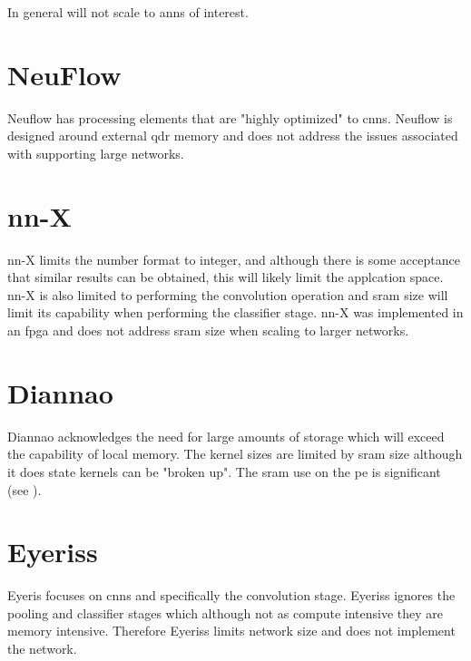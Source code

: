 {{{{In general will not scale to \acp{ann} of interest.


\section{NeuFlow \cite{farabet2011neuflow}}
Neuflow\cite{farabet2011neuflow} has processing elements that are "highly optimized" to \acp{cnn}.
Neuflow is designed around external \ac{qdr} memory and does not address the issues associated with supporting large networks.


\section[nn-X]{nn-X \cite{gokhale2014240}}
nn-X\cite{gokhale2014240} limits the number format to integer, and although there is some acceptance that similar
results can be obtained, this will likely limit the applcation space. nn-X is also limited to performing the convolution operation
and \ac{sram} size will limit its capability when performing the classifier stage.
nn-X was implemented in an fpga and does not address \ac{sram} size when scaling to larger networks.


\section[Diannao]{Diannao \cite{chen2014diannao}}
Diannao\cite{chen2014diannao} acknowledges the need for large amounts of storage which will exceed the capability of local memory.
The kernel sizes are limited by \ac{sram} size although it does state kernels can be "broken up".
The \ac{sram} use on the \ac{pe} is significant (see ).


\section[Eyeriss]{Eyeriss \cite{chen201614}}
Eyeris\cite{chen201614} focuses on \acp{cnn} and specifically the convolution stage.
Eyeriss ignores the pooling and classifier stages which although not as compute intensive they are memory intensive.
Therefore Eyeriss limits network size and does not implement the network.

}}}}
